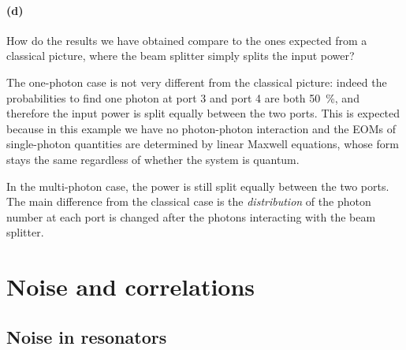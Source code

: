 \documentclass[hyperref, a4paper]{article}
\begin{document}
\paragraph*{(d)} How do the results we have obtained compare to the ones expected from a classical picture, where the beam splitter simply splits the input power?

The one-photon case is not very different from the classical picture:
indeed the probabilities to find one photon at port 3 and port 4 are both \SI{50}{\percent},
and therefore the input power is split equally between the two ports. 
This is expected because in this example we have no photon-photon interaction 
and the EOMs of single-photon quantities are determined by linear Maxwell equations,
whose form stays the same regardless of whether the system is quantum.

In the multi-photon case, the power is still split equally between the two ports.
The main difference from the classical case 
is the \emph{distribution} of the photon number at each port 
is changed after the photons interacting with the beam splitter.

\subsection{}

\section{Noise and correlations}

\subsection{Noise in resonators}
\end{document}
